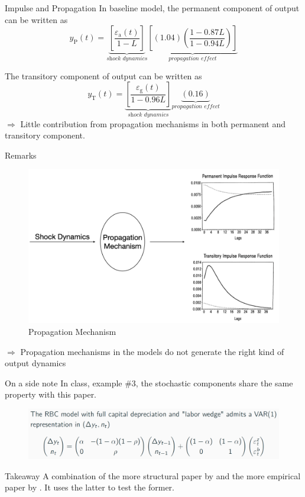\documentclass[10pt]{beamer}
\begin{document}
\begin{frame}{Impulse and Propagation}
    In baseline model, the permanent component of output can be written as
    $$
        y_{\mathrm{P}}(t)=\underbrace{\left[\frac{\varepsilon_{\mathrm{a}}(t)}{1-L}\right]}_{\textit{shock dynamics}}\underbrace{\left[(1.04)\left(\frac{1-0.87 L}{1-0.94 L}\right)\right]}_{\textit{propagation effect}}
    $$

    The transitory component of output can be written as $$
        y_{\mathrm{T}}(t)=\underbrace{\left[\frac{\varepsilon_{\mathrm{g}}(t)}{1-0.96
                    L}\right]}_{\textit{shock dynamics}}\underbrace{(0.16)}_{\textit{propagation
            effect}} $$ $\Rightarrow$ Little contribution from propagation mechanisms in both permanent and transitory component.

\end{frame}

\begin{frame}{Remarks}
    \begin{figure}
        \centering
        \includegraphics[width=0.8\linewidth]{figures/propagation0.png}
        \caption{Propagation Mechanism}
    \end{figure}

    $\Rightarrow$ Propagation mechanisms in the models do not generate the right kind of output dynamics
\end{frame}

\begin{frame}{On a side note}
    In class, example \#3, the stochastic components share the same property with this paper.
        \begin{figure}
        \centering
        \includegraphics[width=0.7\linewidth]{figures/example3.png}
    \end{figure}
    
    \begin{alertblock}{Takeaway}
        A combination of the more structural paper by \cite{christiano_eichenbaum_1992} and the more empirical paper by \cite{blanchard_quah_1988}. It uses the latter to test the former.  
    \end{alertblock}

\end{frame}
\end{document}
